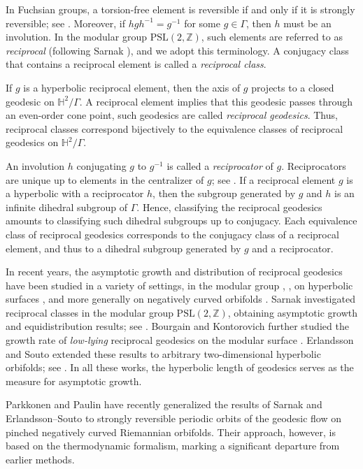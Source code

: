 \documentclass[11pt]{amsart}
\numberwithin{equation}{section}
\theoremstyle{definition}
\numberwithin{equation}{section}
\begin{document}
In Fuchsian groups, a torsion-free element is reversible if and only if it is strongly reversible; see \cite[Theorem 1.1]{DG}. Moreover, if $hgh^{-1} = g^{-1}$ for some $g \in \Gamma$, then $h$ must be an involution. In the modular group $\mathrm{PSL}(2, \mathbb{Z})$, such elements are referred to as \emph{reciprocal} (following Sarnak \cite{Sa}), and we adopt this terminology. A conjugacy class that contains a reciprocal element is called a \emph{reciprocal class}.

If $g$ is a hyperbolic reciprocal element, then the axis of $g$ projects to a closed geodesic on $\mathbb{H}^2/\Gamma$. A reciprocal element implies that this geodesic passes through an even-order cone point, such geodesics are called \emph{reciprocal geodesics}. Thus, reciprocal classes correspond bijectively to the equivalence classes of reciprocal geodesics on $\mathbb{H}^2/\Gamma$.

An involution $h$ conjugating $g$ to $g^{-1}$ is called a \emph{reciprocator} of $g$. Reciprocators are unique up to elements in the centralizer of $g$; see \cite{BR}. If a reciprocal element $g$ is a hyperbolic with a reciprocator $h$,  then the subgroup generated  by $g$ and $h$ is an infinite dihedral subgroup of $\Gamma$.  Hence, classifying the reciprocal geodesics amounts to classifying such dihedral subgroups up to conjugacy. Each equivalence class of reciprocal geodesics corresponds to the conjugacy class of a reciprocal element, and thus to a dihedral subgroup generated by $g$ and a reciprocator.


In recent years, the asymptotic growth and distribution of reciprocal geodesics have been studied in a variety of settings,  in the modular group \cite{Sa}, \cite{BK},  on hyperbolic surfaces \cite{ES}, and more generally on negatively curved orbifolds \cite{PP}.     Sarnak investigated reciprocal classes in the modular group $\mathrm{PSL}(2, \mathbb{Z})$, obtaining asymptotic growth and equidistribution results; see \cite{Sa}. Bourgain and Kontorovich further studied the growth rate of \emph{low-lying} reciprocal geodesics on the modular surface \cite{BK}. Erlandsson and Souto extended these results to arbitrary two-dimensional hyperbolic orbifolds; see \cite{ES}. In all these works, the hyperbolic length of geodesics serves as the measure for asymptotic growth. 

Parkkonen and Paulin \cite{PP} have recently generalized the results of Sarnak and Erlandsson--Souto to strongly reversible periodic orbits of the geodesic flow on pinched negatively curved Riemannian orbifolds. Their approach, however, is based on the thermodynamic formalism, marking a significant departure from earlier methods.
\end{document}
